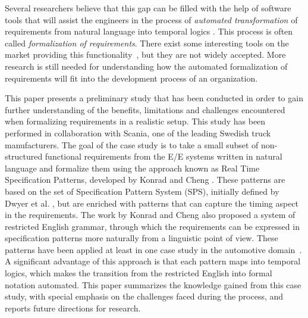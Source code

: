 \documentclass[conference]{IEEEtran}
\begin{document}
Several researchers believe that this gap can be filled with the help of software tools that will assist the engineers in the process of \emph{automated transformation} of requirements from natural language into temporal logics \cite{Cobleigh06userguide} \cite{Konrad05facilitating} \cite{Overmyer01conceptual}. This process is often called \emph{formalization of requirements}. There exist some interesting tools on the market providing this functionality~\cite{Holberg11btc}, but they are not widely accepted.
More research is still needed for understanding how the automated formalization of requirements will fit into the development process of an organization. 

This paper presents a preliminary study that has been conducted in order to gain further understanding of the benefits, limitations and challenges encountered when formalizing requirements in a realistic setup. This study has been performed in collaboration with Scania, one of the leading Swedish truck manufacturers. The goal of the case study is to take a small subset of non-structured functional requirements from the E/E systems written in natural language and formalize them using the approach known as Real Time Specification Patterns, developed by Konrad and Cheng \cite{Konrad05sps}. These patterns are based on the set of Specification Pattern System (SPS), initially defined by Dwyer et al. \cite{Dwyer99sps}, but are enriched with patterns that can capture the timing aspect in the requirements. The work by Konrad and Cheng also proposed a system of restricted English grammar, through which the requirements can be expressed in specification patterns more naturally from a linguistic point of view. These patterns have been applied at least in one case study in the automotive domain~\cite{Post12bosch}. A significant advantage of this approach is that each pattern maps into temporal logics, which makes the transition from the restricted English into formal notation automated. This paper summarizes the knowledge gained from this case study, with special emphasis on the challenges faced during the process, and reports future directions for research.
\end{document}
